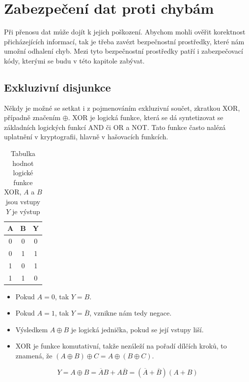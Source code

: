 \chapter{Zabezpečení dat proti chybám}
Při přenosu dat může dojít k jejich poškození. Abychom mohli ověřit korektnost přicházejících informací, tak je třeba zavézt bezpečnostní prostředky, které nám umožní odhalení chyb. Mezi tyto bezpečnostní prostředky patří i zabezpečovací kódy, kterými se budu v této kapitole zabývat.


\section{Exkluzivní disjunkce}
Někdy je možné se setkat i z pojmenováním exkluzivní součet, zkratkou XOR, případně značením $\oplus$. XOR je logická funkce, která se dá syntetizovat se základních logických funkcí AND či OR a NOT. Tato funkce často nalézá uplatnění v kryptografii, hlavně v hašovacích funkcích.

\begin{table}[!h]
  \caption{Tabulka hodnot logické funkce XOR, $A$ a $B$ jsou vstupy $Y$ je výstup}
  \begin{center}
  	\small
	  \begin{tabular}{|c|c||c|}
	    \hline
	    A & B & Y \\
	    \hline\hline
	    0 & 0 & 0 \\
	    \hline
	    0 & 1 & 1 \\
	    \hline
	    1 & 0 & 1 \\
	    \hline
	    1 & 1 & 0 \\
	    \hline
	  \end{tabular}
  \end{center}
\end{table}

\begin{itemize}
    \item Pokud $A = 0$, tak $Y = B$.
    \item Pokud $A = 1$, tak $Y = \overline{B}$, vznikne nám tedy negace.
    \item Výsledkem  $A \oplus B $ je logická jednička, pokud se její vstupy liší.
    \item XOR je funkce komutativní, takže nezáleží na pořadí dílčích kroků, to znamená, že $(A \oplus B) \oplus C = A \oplus (B \oplus C)$.
\end{itemize}

$$ Y = A \oplus B = \overline{A}B + A\overline{B} = (\overline{A} + \overline{B}) (A + B) $$




